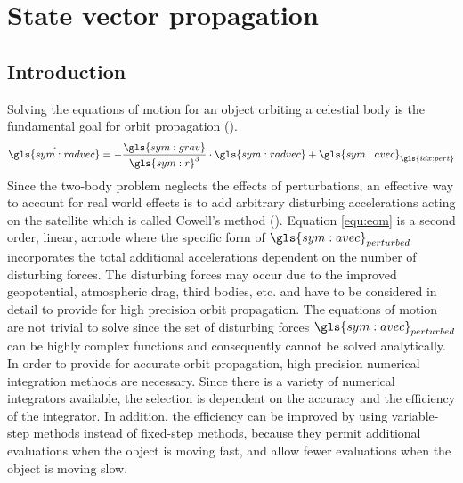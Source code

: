 \section{State vector propagation}
\label{sec:propagation-state}

\subsection{Introduction}
\label{sec:propagation-state-introduction}

Solving the equations of motion for an object orbiting a celestial body is the fundamental goal for orbit propagation (). 
\begin{equation}
  \ddot{\gls{sym:radvec}} = -\frac{\gls{sym:grav}}{\gls{sym:r}^{3}}\cdot \gls{sym:radvec} + \gls{sym:avec}_{\gls{idx:pert}}
\label{equ:eom}
\end{equation}
Since the two-body problem neglects the effects of perturbations, an effective way to account for real world effects is to add arbitrary disturbing 
accelerations acting on the satellite which is called Cowell's method (\cite{vallado2013}). Equation \ref{equ:eom} is a second order, linear, \gls{acr:ode} where the specific 
form of $\gls{sym:avec}_{perturbed}$ incorporates the total additional accelerations dependent on the number of disturbing forces. 
The disturbing forces may occur due to the improved geopotential, atmospheric drag, third bodies, etc. and have to be considered in detail to provide for high precision
orbit propagation.
The equations of motion are not trivial to solve since the set of disturbing forces $\gls{sym:avec}_{perturbed}$ can be highly complex functions and consequently cannot be solved analytically. 
In order to provide for accurate orbit propagation, high precision numerical integration methods are necessary. Since there is a variety of numerical integrators available, the selection is 
dependent on the accuracy and the efficiency of the integrator. In addition, the efficiency can be improved by using variable-step methods instead of fixed-step methods, because they permit 
additional evaluations when the object is moving fast, and allow fewer evaluations when the object is moving slow. 

